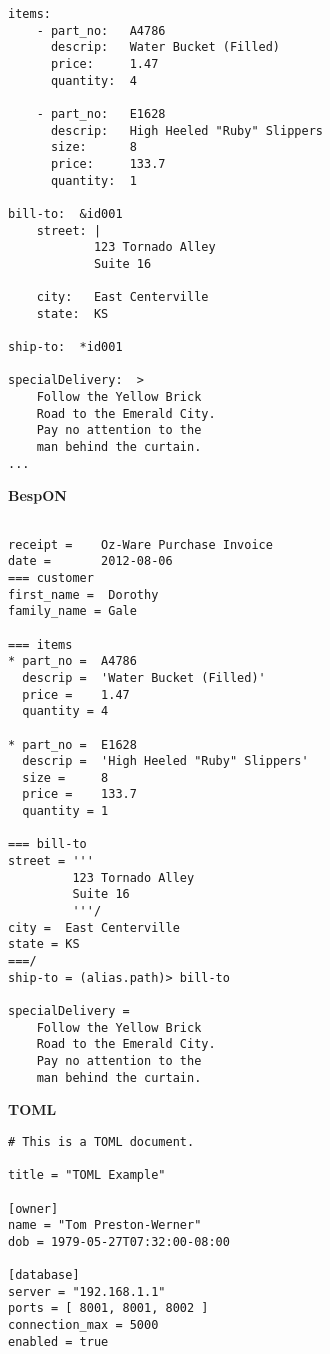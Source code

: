 \documentclass[11pt]{article}
\begin{document}
{{\begin{appendices}
\begin{tcolorbox}{}
\begin{multicols}{2}
\begin{Verbatim}[formatcom=\color{DarkGreen}]
items:
    - part_no:   A4786
      descrip:   Water Bucket (Filled)
      price:     1.47
      quantity:  4

    - part_no:   E1628
      descrip:   High Heeled "Ruby" Slippers
      size:      8
      price:     133.7
      quantity:  1

bill-to:  &id001
    street: |
            123 Tornado Alley
            Suite 16
    
    city:   East Centerville
    state:  KS

ship-to:  *id001

specialDelivery:  >
    Follow the Yellow Brick
    Road to the Emerald City.
    Pay no attention to the
    man behind the curtain.
...
\end{Verbatim}
\columnbreak
\centering \textbf{BespON}

\begin{Verbatim}

receipt =    Oz-Ware Purchase Invoice
date =       2012-08-06
=== customer
first_name =  Dorothy
family_name = Gale

=== items
* part_no =  A4786
  descrip =  'Water Bucket (Filled)'
  price =    1.47
  quantity = 4

* part_no =  E1628
  descrip =  'High Heeled "Ruby" Slippers'
  size =     8
  price =    133.7
  quantity = 1

=== bill-to
street = '''
         123 Tornado Alley
         Suite 16
         '''/
city =  East Centerville
state = KS
===/
ship-to = (alias.path)> bill-to

specialDelivery =
    Follow the Yellow Brick
    Road to the Emerald City.
    Pay no attention to the
    man behind the curtain.

\end{Verbatim}
\end{multicols}
\end{tcolorbox}



\begin{tcolorbox}{}
\begin{multicols}{2}

\centering \textbf{TOML}
\begin{Verbatim}[formatcom=\color{DarkGreen}]
# This is a TOML document.

title = "TOML Example"

[owner]
name = "Tom Preston-Werner"
dob = 1979-05-27T07:32:00-08:00

[database]
server = "192.168.1.1"
ports = [ 8001, 8001, 8002 ]
connection_max = 5000
enabled = true


\end{Verbatim}
\end{multicols}
\end{tcolorbox}
\end{appendices}}}
\end{document}

